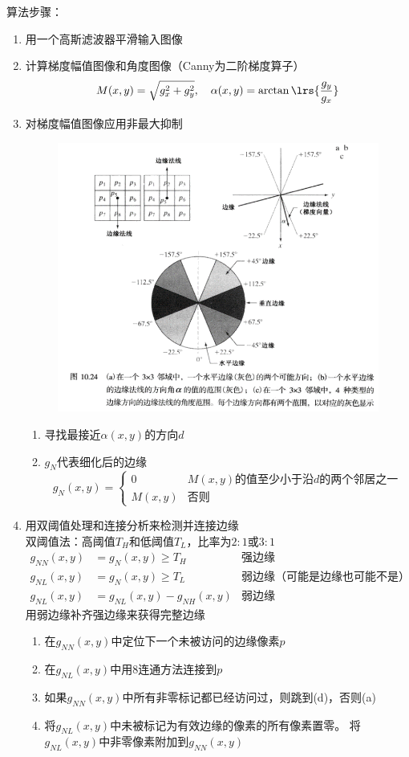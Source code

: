算法步骤：
\begin{enumerate}
	\item 用一个高斯滤波器平滑输入图像
	\item 计算梯度幅值图像和角度图像（Canny为二阶梯度算子）
	\[M(x,y)=\sqrt{g_x^2+g_y^2},\quad\alpha(x,y)=\arctan\lrs{\frac{g_y}{g_x}}\]
	\item 对梯度幅值图像应用非最大抑制
\begin{figure}[H]
\centering
\includegraphics[width=0.6\linewidth]{fig/canny-margin.png}
\end{figure}
\begin{enumerate}
	\item 寻找最接近$\alpha(x,y)$的方向$d$
	\item $g_N$代表细化后的边缘
	\[g_N(x,y)=\begin{cases}0 & M(x,y)\text{的值至少小于沿$d$的两个邻居之一}\\M(x,y) & \text{否则}\end{cases}\]
\end{enumerate}
	\item 用双阈值处理和连接分析来检测并连接边缘\\
	双阈值法：高阈值$T_H$和低阈值$T_L$，比率为$2:1$或$3:1$
	\[\begin{aligned}
	g_{NN}(x,y) &= g_N(x,y)\geq T_H & \text{强边缘}\\
	g_{NL}(x,y) &= g_N(x,y)\geq T_L & \text{弱边缘（可能是边缘也可能不是）+强边缘}\\
	g_{NL}(x,y) &= g_{NL}(x,y)-g_{NH}(x,y) & \text{弱边缘}
	\end{aligned}\]
	用弱边缘补齐强边缘来获得完整边缘
\begin{enumerate}
	\item 在$g_{NN}(x,y)$中定位下一个未被访问的边缘像素$p$
	\item 在$g_{NL}(x,y)$中用8连通方法连接到$p$
	\item 如果$g_{NN}(x,y)$中所有非零标记都已经访问过，则跳到(d)，否则(a)
	\item 将$g_{NL}(x,y)$中未被标记为有效边缘的像素的所有像素置零。
	将$g_{NL}(x,y)$中非零像素附加到$g_{NN}(x,y)$
\end{enumerate}
\end{enumerate}

